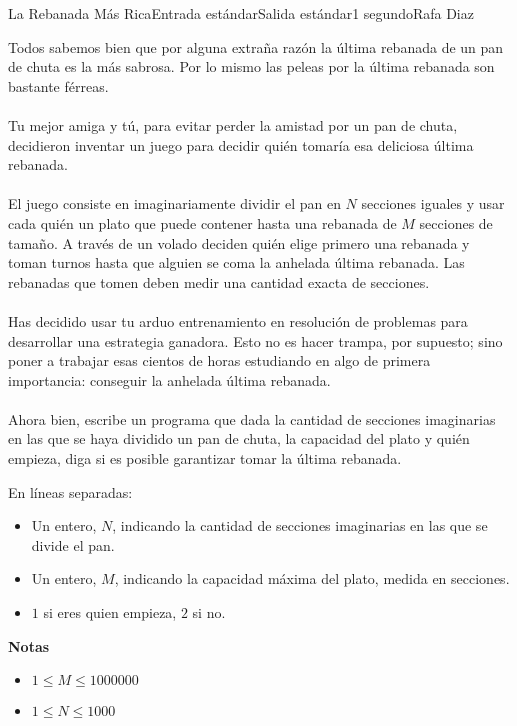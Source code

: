 \begin{problem}{La Rebanada Más Rica}{Entrada estándar}{Salida estándar}{1 segundo}{}{Rafa Diaz}

Todos sabemos bien que por alguna extraña razón la última rebanada de un pan de chuta es la más sabrosa. Por lo mismo las peleas por la última rebanada son bastante férreas.
\\ \\
Tu mejor amiga y tú, para evitar perder la amistad por un pan de chuta, decidieron inventar un juego para decidir quién tomaría esa deliciosa última rebanada.
\\ \\
El juego consiste en imaginariamente dividir el pan en $N$ secciones iguales y usar cada quién un plato que puede contener hasta una rebanada de $M$ secciones de tamaño. A través de un volado deciden quién elige primero una rebanada y toman turnos hasta que alguien se coma la anhelada última rebanada. Las rebanadas que tomen deben medir una cantidad exacta de secciones.
\\\\
Has decidido usar tu arduo entrenamiento en resolución de problemas para desarrollar una estrategia ganadora. Esto no es hacer trampa, por supuesto; sino poner a trabajar esas cientos de horas estudiando en algo de primera importancia: conseguir la anhelada última rebanada.
\\\\
Ahora bien, escribe un programa que dada la cantidad de secciones imaginarias en las que se haya dividido un pan de chuta, la capacidad del plato y quién empieza, diga si es posible garantizar tomar la última rebanada.


\InputFile

En líneas separadas:
\begin{itemize}
    \item Un entero, $N$, indicando la cantidad de secciones imaginarias en las que se divide el pan.
    \item Un entero, $M$, indicando la capacidad máxima del plato, medida en secciones.
    \item $1$ si eres quien empieza, $2$ si no.
\end{itemize}

\textbf{Notas}
\begin{itemize}
    \item $1 \le M \le 1000000$
    \item $1 \le N \le 1000$
\end{itemize}


\end{problem}
